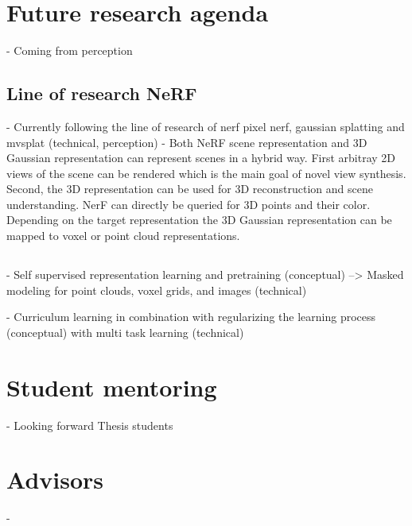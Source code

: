 \section{Future research agenda}
- Coming from perception

\subsection{Line of research NeRF}
- Currently following the line of research of nerf \cite{mildenhall2021nerf} pixel nerf, gaussian splatting and mvsplat (technical, perception)
- Both NeRF scene representation and 3D Gaussian representation can represent scenes in a hybrid way. First arbitray 2D views 
of the scene can be rendered which is the main goal of novel view synthesis. Second, the 3D representation can be used for
3D reconstruction and scene understanding. NerF can directly be queried for 3D points and their color. Depending on the target representation the 3D Gaussian representation
can be mapped to voxel or point cloud representations.
\subsection{}
- Self supervised representation learning and pretraining (conceptual)
    --> Masked modeling for point clouds, voxel grids, and images (technical)

- Curriculum learning in combination with regularizing the learning process (conceptual) with multi task learning (technical)
\section{Student mentoring}
- Looking forward Thesis students
\section{Advisors}
- \color{red}{Valada and Geiger} \color{black}